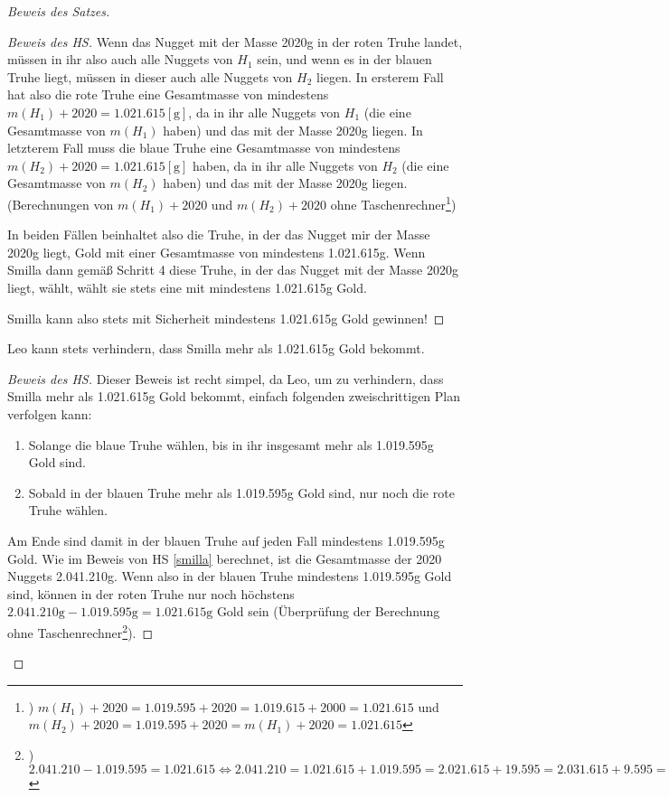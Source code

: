 \begin{proof}[Beweis des Satzes]
\begin{proof}[Beweis des HS]
        Wenn das Nugget mit der Masse 2020g in der roten Truhe landet, müssen in ihr also auch alle Nuggets von $H_1$ 
        sein, und wenn es in der blauen Truhe liegt, müssen in dieser auch alle Nuggets von $H_2$ liegen. In ersterem 
        Fall hat also die rote Truhe eine Gesamtmasse von mindestens $m(H_1)+2020=1.021.615 [\text{g}]$, da in ihr 
        alle Nuggets von $H_1$ (die eine Gesamtmasse von $m(H_1)$ haben) und das mit der Masse 2020g liegen. In 
        letzterem Fall muss die blaue Truhe eine Gesamtmasse von mindestens $m(H_2)+2020=1.021.615 [\text{g}]$ haben,
        da in ihr alle Nuggets von $H_2$ (die eine Gesamtmasse von $m(H_2)$ haben) und das mit der Masse 2020g 
        liegen. (Berechnungen von $m(H_1)+2020$ und $m(H_2)+2020$ ohne Taschenrechner\footnote{) $m(H_1)+2020=
        1.019.595+2020=1.019.615+2000=1.021.615$ und $m(H_2)+2020=1.019.595+2020=m(H_1)+2020=1.021.615$})

        In beiden Fällen beinhaltet also die Truhe, in der das Nugget mir der Masse 2020g liegt, Gold mit einer 
        Gesamtmasse von mindestens 1.021.615g. Wenn Smilla dann gemäß Schritt 4 diese Truhe, in der das Nugget mit 
        der Masse 2020g liegt, wählt, wählt sie stets eine mit mindestens 1.021.615g Gold.

        Smilla kann also stets mit Sicherheit mindestens 1.021.615g Gold gewinnen!
    \end{proof}
    \begin{lem}\label{leo}
        Leo kann stets verhindern, dass Smilla mehr als 1.021.615g Gold bekommt.
    \end{lem}
    \begin{proof}[Beweis des HS]
        Dieser Beweis ist recht simpel, da Leo, um zu verhindern, dass Smilla mehr als 1.021.615g Gold bekommt, 
        einfach folgenden zweischrittigen Plan verfolgen kann:
        \begin{enumerate}
            \item Solange die blaue Truhe wählen, bis in ihr insgesamt mehr als 1.019.595g Gold sind.
            \item Sobald in der blauen Truhe mehr als 1.019.595g Gold sind, nur noch die rote Truhe wählen.
        \end{enumerate}
        Am Ende sind damit in der blauen Truhe auf jeden Fall mindestens 1.019.595g Gold. Wie im Beweis von HS 
        \ref{smilla} berechnet, ist die Gesamtmasse der 2020 Nuggets 2.041.210g. Wenn also in der blauen Truhe 
        mindestens 1.019.595g Gold sind, können in der roten Truhe nur noch höchstens $2.041.210\text{g}-1.019.595
        \text{g}=1.021.615\text{g}$ Gold sein (Überprüfung der Berechnung ohne Taschenrechner\footnote{) $2.041.210-
        1.019.595=1.021.615\Leftrightarrow 2.041.210=1.021.615+1.019.595=2.021.615+19.595=2.031.615+9.595=2.040.615
        +595=2.041.115+95=2.041.210$}).


\end{proof}
\end{proof}
